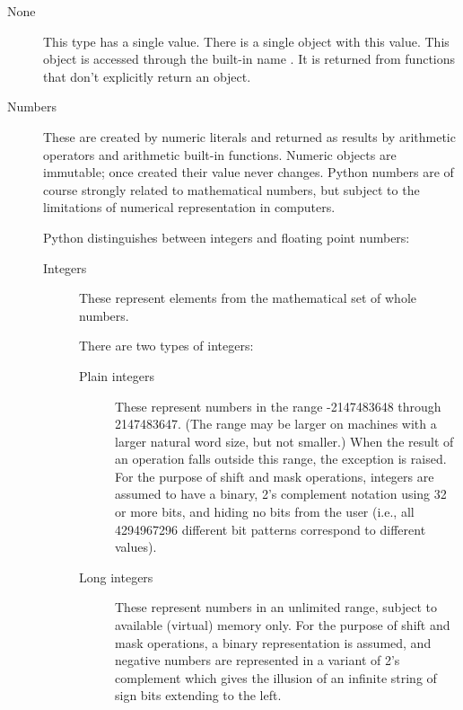 \begin{description}

\item[None]
This type has a single value.  There is a single object with this value.
This object is accessed through the built-in name .
It is returned from functions that don't explicitly return an object.

\item[Numbers]
These are created by numeric literals and returned as results by
arithmetic operators and arithmetic built-in functions.  Numeric
objects are immutable; once created their value never changes.  Python
numbers are of course strongly related to mathematical numbers, but
subject to the limitations of numerical representation in computers.

Python distinguishes between integers and floating point numbers:

\begin{description}
\item[Integers]
These represent elements from the mathematical set of whole numbers.

There are two types of integers:

\begin{description}

\item[Plain integers]
These represent numbers in the range -2147483648 through 2147483647.
(The range may be larger on machines with a larger natural word
size, but not smaller.)
When the result of an operation falls outside this range, the
exception  is raised.
For the purpose of shift and mask operations, integers are assumed to
have a binary, 2's complement notation using 32 or more bits, and
hiding no bits from the user (i.e., all 4294967296 different bit
patterns correspond to different values).

\item[Long integers]
These represent numbers in an unlimited range, subject to available
(virtual) memory only.  For the purpose of shift and mask operations,
a binary representation is assumed, and negative numbers are
represented in a variant of 2's complement which gives the illusion of
an infinite string of sign bits extending to the left.

\end{description} %


\end{description}
\end{description}
